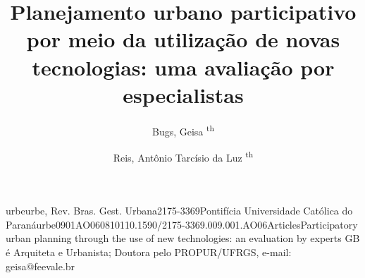 \documentclass{article}
\begin{document}
\title{Planejamento urbano participativo por meio da utilização de novas
tecnologias: uma avaliação por especialistas}
\author[\textsuperscript{th}
]{Bugs, Geisa
\textsuperscript{th}
}
\author[\textsuperscript{th}
]{Reis, Antônio Tarcísio da Luz
\textsuperscript{th}
}

\maketitle

urbeurbe, Rev. Bras. Gest.
Urbana2175-3369Pontifícia Universidade Católica do
Paranáurbe0901AO060810110.1590/2175-3369.009.001.AO06ArticlesParticipatory urban
planning through the use of new technologies:
an evaluation by experts
GB é Arquiteta e Urbanista; Doutora pelo PROPUR/UFRGS, e-mail:
geisa@feevale.br
\end{document}
